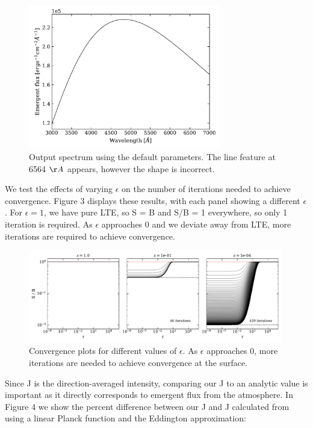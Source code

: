 \documentclass[12pt]{article}
\begin{document}
\begin{figure}[ht]
 \centering
 \includegraphics[width=0.75\textwidth]{test_spectrum.pdf}
 \caption{Output spectrum using the default parameters. The line feature at 6564 $\AA$ appears, however the shape is incorrect.}
\end{figure}

We test the effects of varying $\epsilon$ on the number of iterations needed to achieve convergence. Figure 3 displays these results, with each panel showing a different $\epsilon$. For $\epsilon = 1$, we have pure LTE, so S = B and S/B = 1 everywhere, so only 1 iteration is required. As $\epsilon$ approaches 0 and we deviate away from LTE, more iterations are required to achieve convergence. 

\begin{figure}[ht]
 \centering
 \includegraphics[width=0.99\textwidth]{eps_convergence.pdf}
 \caption{Convergence plots for different values of $\epsilon$. As $\epsilon$ approaches 0, more iterations are needed to achieve convergence at the surface.}
\end{figure}

Since J is the direction-averaged intensity, comparing our J to an analytic value is important as it directly corresponds to emergent flux from the atmosphere. In Figure 4 we show the percent difference between our J and J calculated from using a linear Planck function and the Eddington approximation: 
\end{document}

